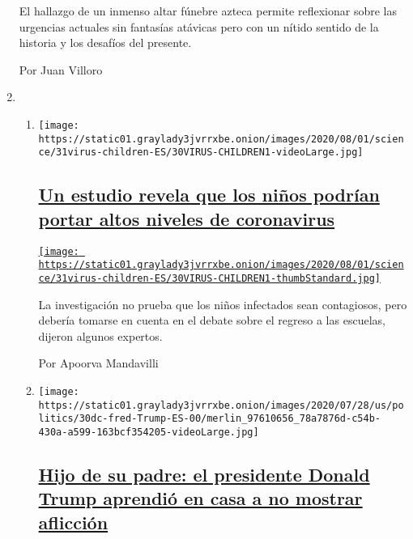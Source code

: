 \begin{enumerate}
  El hallazgo de un inmenso altar fúnebre azteca permite reflexionar
  sobre las urgencias actuales sin fantasías atávicas pero con un nítido
  sentido de la historia y los desafíos del presente.

  Por Juan Villoro
\item
  \begin{enumerate}
  \def\labelenumii{\arabic{enumii}.}
  \item
    \texttt{[image: https://static01.graylady3jvrrxbe.onion/images/2020/08/01/science/31virus-children-ES/30VIRUS-CHILDREN1-videoLarge.jpg]}

    \hypertarget{un-estudio-revela-que-los-niuxf1os-podruxedan-portar-altos-niveles-de-coronavirus}{%
    \subsection{\texorpdfstring{\href{/es/2020/07/31/espanol/ciencia-y-tecnologia/ninos-contagio-coronavirus.html}{Un
    estudio revela que los niños podrían portar altos niveles de
    coronavirus}}{Un estudio revela que los niños podrían portar altos niveles de coronavirus}}\label{un-estudio-revela-que-los-niuxf1os-podruxedan-portar-altos-niveles-de-coronavirus}}

    \href{/es/2020/07/31/espanol/ciencia-y-tecnologia/ninos-contagio-coronavirus.html}{\texttt{[image: https://static01.graylady3jvrrxbe.onion/images/2020/08/01/science/31virus-children-ES/30VIRUS-CHILDREN1-thumbStandard.jpg]}}

    La investigación no prueba que los niños infectados sean
    contagiosos, pero debería tomarse en cuenta en el debate sobre el
    regreso a las escuelas, dijeron algunos expertos.

    Por Apoorva Mandavilli
  \item
    \texttt{[image: https://static01.graylady3jvrrxbe.onion/images/2020/07/28/us/politics/30dc-fred-Trump-ES-00/merlin\_97610656\_78a7876d-c54b-430a-a599-163bcf354205-videoLarge.jpg]}

    \hypertarget{hijo-de-su-padre-el-presidente-donald-trump-aprendiuxf3-en-casa-a-no-mostrar-aflicciuxf3n}{%
    \subsection{\texorpdfstring{\href{/es/2020/07/31/espanol/estados-unidos/fred-trump-donald-trump.html}{Hijo
    de su padre: el presidente Donald Trump aprendió en casa a no
    mostrar
    aflicción}}{Hijo de su padre: el presidente Donald Trump aprendió en casa a no mostrar aflicción}}\label{hijo-de-su-padre-el-presidente-donald-trump-aprendiuxf3-en-casa-a-no-mostrar-aflicciuxf3n}}


\end{enumerate}
\end{enumerate}

